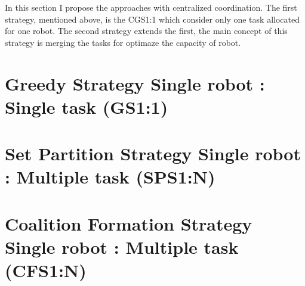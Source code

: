 In this section I propose the approaches with centralized coordination.
The first strategy, mentioned above, is the CGS1:1 which consider only 
one task allocated for one robot.
The second strategy extends the first, the main concept of this strategy 
is merging the tasks for optimaze the capacity of robot.

\section{Greedy Strategy Single robot : Single task (GS1:1)}





\section{Set Partition Strategy Single robot : Multiple task (SPS1:N)}





\section{Coalition Formation Strategy Single robot : Multiple task (CFS1:N)}

